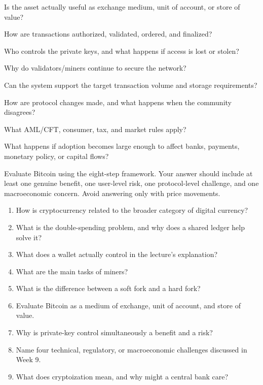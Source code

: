 \begin{utpsteps}
  \item {} Is the asset actually useful as exchange medium, unit of account, or store of value?
  \item {} How are transactions authorized, validated, ordered, and finalized?
  \item {} Who controls the private keys, and what happens if access is lost or stolen?
  \item {} Why do validators/miners continue to secure the network?
  \item {} Can the system support the target transaction volume and storage requirements?
  \item {} How are protocol changes made, and what happens when the community disagrees?
  \item {} What AML/CFT, consumer, tax, and market rules apply?
  \item {} What happens if adoption becomes large enough to affect banks, payments, monetary policy, or capital flows?
\end{utpsteps}

\begin{tryit}
Evaluate Bitcoin using the eight-step framework. Your answer should include at least one genuine benefit, one user-level risk, one protocol-level challenge, and one macroeconomic concern. Avoid answering only with price movements.
\end{tryit}

\begin{quickcheck}
\begin{enumerate}
  \item How is cryptocurrency related to the broader category of digital currency?
  \item What is the double-spending problem, and why does a shared ledger help solve it?
  \item What does a wallet actually control in the lecture's explanation?
  \item What are the main tasks of miners?
  \item What is the difference between a soft fork and a hard fork?
  \item Evaluate Bitcoin as a medium of exchange, unit of account, and store of value.
  \item Why is private-key control simultaneously a benefit and a risk?
  \item Name four technical, regulatory, or macroeconomic challenges discussed in Week 9.
  \item What does cryptoization mean, and why might a central bank care?
\end{enumerate}
\end{quickcheck}
